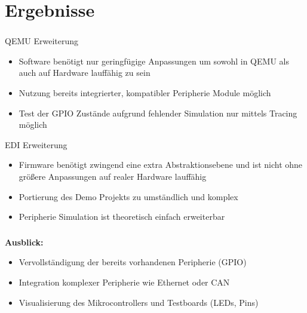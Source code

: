 
\section{Ergebnisse}

\begin{frame}[fragile]
    \begin{center}
        \huge\textbf{\insertsection}
    \end{center}
\end{frame}

\begin{frame}[allowframebreaks]
\frametitle{\insertsection}

\begin{block}{QEMU Erweiterung}
\begin{itemize}
    \item Software benötigt nur geringfügige Anpassungen um sowohl in QEMU als
        auch auf Hardware lauffähig zu sein
    \item Nutzung bereits integrierter, kompatibler Peripherie Module möglich
    \item Test der GPIO Zustände aufgrund fehlender Simulation nur mittels
        Tracing möglich
\end{itemize}
\end{block}
\newpage
\begin{block}{EDI Erweiterung}
\begin{itemize}
    \item Firmware benötigt zwingend eine extra Abstraktionsebene und ist nicht
        ohne größere Anpassungen auf realer Hardware lauffähig
    \item Portierung des Demo Projekts zu umständlich und komplex
    \item Peripherie Simulation ist theoretisch einfach erweiterbar
\end{itemize}
\end{block}

\end{frame}

\begin{frame}[fragile]
\frametitle{\insertsection}

\textbf{Ausblick:}
\begin{itemize}
    \item Vervollständigung der bereits vorhandenen Peripherie (GPIO)
    \item Integration komplexer Peripherie wie Ethernet oder CAN
    \item Visualisierung des Mikrocontrollers und Testboards (LEDs, Pins)
\end{itemize}

\end{frame}

